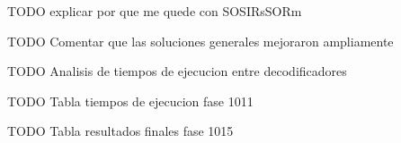 \bigskip

TODO explicar por que me quede con SOSIRsSORm

\bigskip

TODO Comentar que las soluciones generales mejoraron ampliamente

\bigskip

TODO Analisis de tiempos de ejecucion entre decodificadores

\bigskip

TODO Tabla tiempos de ejecucion fase 1011

\bigskip

TODO Tabla resultados finales fase 1015



